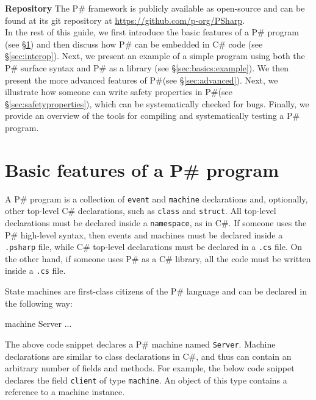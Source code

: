 \documentclass{llncs}
\newcommand{\ps}{P\#\xspace}
\newcommand{\cs}{C\#\xspace}
\newcommand{\newparagraph}[1]{\smallskip\noindent\textbf{#1 }}
\begin{document}
\newparagraph{Repository} The \ps framework is publicly available as open-source and can be found at its git repository at \textcolor{blue}{\url{https://github.com/p-org/PSharp}}.\\

\noindent
In the rest of this guide, we first introduce the basic features of a \ps program (see \S\ref{sec:basics}) and then discuss how \ps can be embedded in \cs code (see \S\ref{sec:interop}). Next, we present an example of a simple program using both the \ps surface syntax and \ps as a library (see \S\ref{sec:basics:example}). We then present the more advanced features of \ps (see \S\ref{sec:advanced}). Next, we illustrate how someone can write safety properties in \ps (see \S\ref{sec:safetyproperties}), which can be systematically checked for bugs. Finally, we provide an overview of the tools for compiling and systematically testing a \ps program.

\section{Basic features of a \ps program}
\label{sec:basics}

A \ps program is a collection of \texttt{event} and \texttt{machine} declarations and, optionally, other top-level \cs declarations, such as \texttt{class} and \texttt{struct}. All top-level declarations must be declared inside a \texttt{namespace}, as in \cs. If someone uses the \ps high-level syntax, then events and machines must be declared inside a \texttt{.psharp} file, while \cs top-level declarations must be declared in a \texttt{.cs} file. On the other hand, if someone uses \ps as a \cs library, all the code must be written inside a \texttt{.cs} file.

State machines are first-class citizens of the \ps language and can be declared in the following way:

\begin{psharpNoLines}
machine Server { ... }
\end{psharpNoLines}

\noindent
The above code snippet declares a \ps machine named \texttt{Server}. Machine declarations are similar to class declarations in \cs, and thus can contain an arbitrary number of fields and methods. For example, the below code snippet declares the field \texttt{client} of type \texttt{machine}. An object of this type contains a reference to a machine instance.
\end{document}
